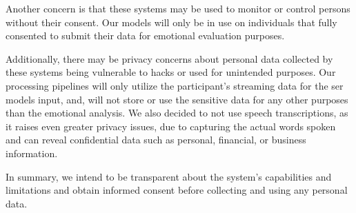 Another concern is that these systems may be used to monitor or control persons without their consent. Our models will only be in use on individuals that fully consented to submit their data for emotional evaluation purposes.

Additionally, there may be privacy concerns about personal data collected by these systems being vulnerable to hacks or used for unintended purposes. Our processing pipelines will only utilize the participant's streaming data for the \ac{ser} models input, and, will not store or use the sensitive data for any other purposes than the emotional analysis. We also decided to not use speech transcriptions, as it raises even greater privacy issues, due to capturing the actual words spoken and can reveal confidential data such as personal, financial, or business information.

In summary, we intend to be transparent about the system's capabilities and limitations and obtain informed consent before collecting and using any personal data.

